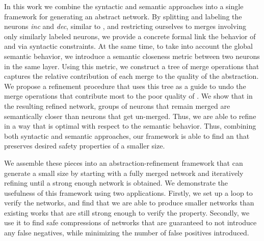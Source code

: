 In this work we combine the syntactic and semantic approaches into a single
framework for generating an abstract network. By splitting and labeling the
neurons \textit{inc} and \textit{dec}, similar to \cite{cegar-nn}, and
restricting ourselves to merges involving only similarly labeled neurons, we
provide a concrete formal link the behavior of \cnc and \abs via
syntactic constraints. At the same time, to take into account the global
semantic behavior, we introduce a semantic closeness metric between two neurons
in the same layer. Using this metric, we construct a tree of merge operations
that captures the relative contribution of each merge to the quality of the
abstraction. We propose a refinement procedure that uses this tree as a guide
to undo the merge operations that contribute most to the poor quality of \abs.
We show that in the resulting refined network, groups of neurons that remain
merged are semantically closer than neurons that get un-merged. Thus, we are
able to refine \abs in a way that is optimal with respect to the semantic
behavior. Thus, combining both syntactic and semantic approaches, our framework
is able to find an \abs that preserves desired safety properties of a smaller
size.

We assemble these pieces into an abstraction-refinement framework that can
generate a small size \abs by starting with a fully merged network and
iteratively refining until a strong enough network is obtained. We demonstrate
the usefulness of this framework using two applications. Firstly, we set up a
\cegar loop to verify the \acasxu networks, and find that we are able to produce
smaller networks than existing works that are still strong enough to verify the
property. Secondly, we use it 
to find safe compressions of
\mnist networks that are guaranteed to not introduce any false negatives, while
minimizing the number of false positives introduced. 



